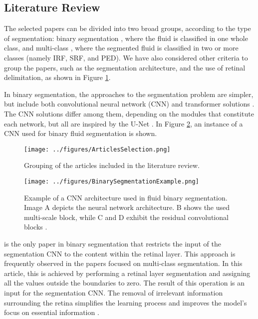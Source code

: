 \subsection{Literature Review}\label{FluidSegmentationLiteratureReview}
The selected papers can be divided into two broad groups, according to the type of segmentation: binary segmentation \parencite{Quek2022, Pawan2021, Liu2021, Guo2020, Wang2021, Wu2023}, where the fluid is classified in one whole class, and multi-class \parencite{Rahil2023, Hassan2021a, Zhang2023, Sappa2021, Xing2022, Tang2022, Padilla2022, Hu2019, Mantel2021, Liu2024, Li2023, Gao2019, Hassan2021b, Lu2019}, where the segmented fluid is classified in two or more classes (namely IRF, SRF, and PED). We have also considered other criteria to group the papers, such as the segmentation architecture, and the use of retinal delimitation, as shown in Figure \ref{fig:ArticlesSelection}.
\par
In binary segmentation, the approaches to the segmentation problem are simpler, but include both convolutional neural network (CNN) \parencite{Pawan2021, Liu2021, Guo2020, Wang2021, Wu2023} and transformer solutions \parencite{Quek2022}. The CNN solutions differ among them, depending on the modules that constitute each network, but all are inspired by the U-Net \parencite{Ronneberger2015}. In Figure \ref{fig:BinarySegmentationExample}, an instance of a CNN used for binary fluid segmentation is shown.
\begin{figure}[!ht]
	\centering
	\texttt{[image: ../figures/ArticlesSelection.png]}
	\caption{Grouping of the articles included in the literature review.}
	\label{fig:ArticlesSelection}
\end{figure}
\begin{figure}[!ht]
	\centering
	\texttt{[image: ../figures/BinarySegmentationExample.png]}
	\caption{Example of a CNN architecture used in fluid binary segmentation. Image A depicts the neural network architecture. B shows the used multi-scale block, while C and D exhibit the residual convolutional blocks \cite{Guo2020}.}
	\label{fig:BinarySegmentationExample}
\end{figure}
\par
\textcite{Pawan2021} is the only paper in binary segmentation that restricts the input of the segmentation CNN to the content within the retinal layer. This approach is frequently observed in the papers focused on multi-class segmentation. In this article, this is achieved by performing a retinal layer segmentation and assigning all the values outside the boundaries to zero. The result of this operation is an input for the segmentation CNN. The removal of irrelevant information surrounding the retina simplifies the learning process and improves the model's focus on essential information \cite{Mantel2021}.
